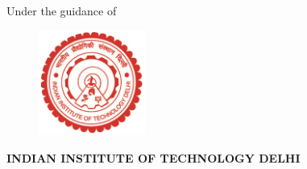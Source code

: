 \thispagestyle{empty}
\begin{center}
    { \large {\bfseries {\mytitle}} \par}
\vspace{3\baselineskip}
\vspace{\baselineskip}
\vspace{\baselineskip}
    {\large \bf \mydegree \par} 
\vspace{\baselineskip}
\vspace{\baselineskip}
    {{\large {\bf \myname \\ \myrollno}} \par}
\vspace{1.5\baselineskip}
    {Under the guidance of \par}
\vspace{\baselineskip}
    {{\large \bf \mysupervisor} \par}
\vspace{1.5\baselineskip}
    {\begin{figure}[!h] 
	\centering
	\includegraphics[width=35mm]{./Images/iitdlogo.PNG} 
     \end{figure}
    }
\vspace{1.5\baselineskip}
    {\bf \MakeUppercase{\mydep} \par}
\vspace*{1ex}
    {\bf \uppercase{Indian Institute of Technology Delhi} \par}
 \end{center}
